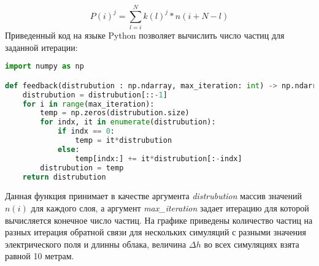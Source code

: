\begin{equation}
P(i)^{j} = \sum_{l=i}^{N} k(l)^j * n(i+N-l)
\end{equation}
Приведенный код на языке Python позволяет вычислить число частиц для заданной итерации:
\begin{lstlisting}[language=Python]
import numpy as np

def feedback(distrubution : np.ndarray, max_iteration: int) -> np.ndarray:
    distrubution = distrubution[::-1]
    for i in range(max_iteration):
        temp = np.zeros(distrubution.size)
        for indx, it in enumerate(distrubution):
            if indx == 0:
                temp = it*distrubution
            else:
                temp[indx:] += it*distrubution[:-indx]
        distrubution = temp
    return distrubution
\end{lstlisting}
Данная функция принимает в качестве аргумента \textit{distrubution} массив значений $n(i)$ для каждого слоя, а аргумент \textit{max\_iteration} задает итерацию для которой вычисляется конечное число частиц. На графике приведены количество частиц на разных итерация обратной связи для нескольких симуляций с разными значения электрического поля и длинны облака, величина $\Delta h$ во всех симуляциях взята равной 10 метрам. 


